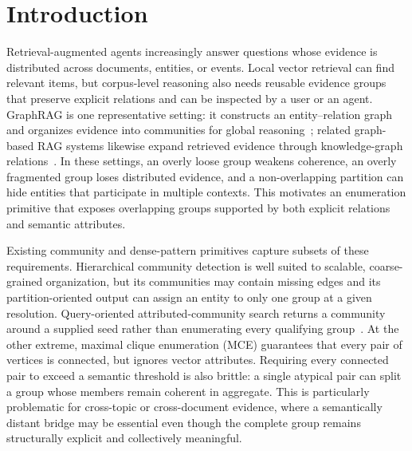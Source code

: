 \documentclass[sigconf, nonacm]{acmart}
\begin{document}
\vldbtopmatter

\section{Introduction}
\label{sec:intro}

Retrieval-augmented agents increasingly answer questions whose evidence is
distributed across documents, entities, or events. Local vector retrieval can
find relevant items, but corpus-level reasoning also needs reusable evidence
groups that preserve explicit relations and can be inspected by a user or an
agent. GraphRAG is one representative setting: it constructs an
entity--relation graph and organizes evidence into communities for global
reasoning~\cite{edge2024graphrag}; related graph-based RAG systems likewise
expand retrieved evidence through knowledge-graph relations~\cite{zhu2025kg2rag}.
In these settings, an overly loose group weakens coherence, an overly
fragmented group loses distributed evidence, and a non-overlapping partition
can hide entities that participate in multiple contexts. This motivates an
enumeration primitive that exposes overlapping groups supported by both
explicit relations and semantic attributes.

Existing community and dense-pattern primitives capture subsets of these
requirements. Hierarchical community detection is well suited to scalable,
coarse-grained organization, but its communities may contain missing edges and
its partition-oriented output can assign an entity to only one group at a given
resolution. Query-oriented attributed-community search returns a community
around a supplied seed rather than enumerating every qualifying
group~\cite{fang2016,huang2017,ruan2013codicil}. At the other extreme, maximal
clique enumeration (MCE) guarantees that every pair of vertices is connected,
but ignores vector attributes. Requiring every connected pair to exceed a
semantic threshold is also brittle: a single atypical pair can split a group
whose members remain coherent in aggregate. This is particularly problematic
for cross-topic or cross-document evidence, where a semantically distant bridge
may be essential even though the complete group remains structurally explicit
and collectively meaningful.
\end{document}
